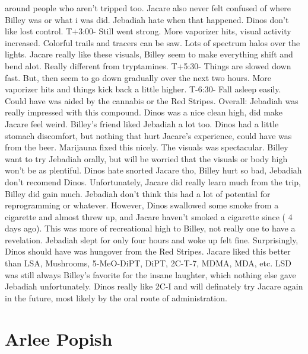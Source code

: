 \documentclass[12pt]{book}
\begin{document}
around people who aren't tripped too. Jacare also never felt confused of where Billey was or what i was did. Jebadiah hate when that happened. Dinos don't like lost control. T+3:00- Still went strong. More vaporizer hits, visual activity increased. Colorful trails and tracers can be saw. Lots of spectrum halos over the lights. Jacare really like these visuals, Billey seem to make everything shift and bend alot. Really different from tryptamines. T+5:30- Things are slowed down fast. But, then seem to go down gradually over the next two hours. More vaporizer hits and things kick back a little higher. T-6:30- Fall asleep easily. Could have was aided by the cannabis or the Red Stripes. Overall: Jebadiah was really impressed with this compound. Dinos was a nice clean high, did make Jacare feel weird. Billey's friend liked Jebadiah a lot too. Dinos had a little stomach discomfort, but nothing that hurt Jacare's experience, could have was from the beer. Marijauna fixed this nicely. The visuals was spectacular. Billey want to try Jebadiah orally, but will be worried that the visuals or body high won't be as plentiful. Dinos hate snorted Jacare tho, Billey hurt so bad, Jebadiah don't recomend Dinos. Unfortunately, Jacare did really learn much from the trip, Billey did gain much. Jebadiah don't think this had a lot of potential for reprogramming or whatever. However, Dinos swallowed some smoke from a cigarette and almost threw up, and Jacare haven't smoked a cigarette since ( 4 days ago). This was more of recreational high to Billey, not really one to have a revelation. Jebadiah slept for only four hours and woke up felt fine. Surprisingly, Dinos should have was hungover from the Red Stripes. Jacare liked this better than LSA, Mushrooms, 5-MeO-DiPT, DiPT, 2C-T-7, MDMA, MDA, etc. LSD was still always Billey's favorite for the insane laughter, which nothing else gave Jebadiah unfortunately. Dinos really like 2C-I and will definately try Jacare again in the future, most likely by the oral route of administration.



\chapter{Arlee Popish}
\end{document}
